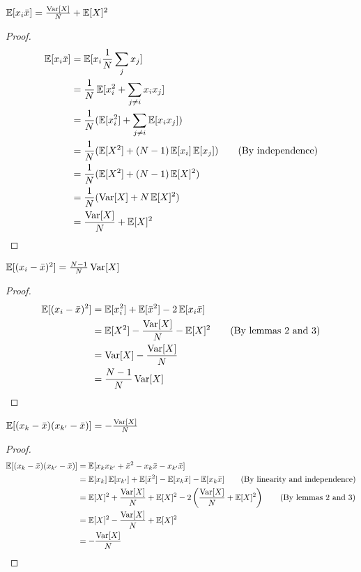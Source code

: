 \documentclass[11pt]{hw-template}
\begin{document}
    \begin{lemma}
      $\Ex[x_i\bar{x}] = \frac{\Var[X]}{N} + \Ex[X]^2$
    \end{lemma}
    \begin{proof}
      \begin{align*}
        \Ex[x_i\bar{x}] 
        &= \Ex[x_i\frac{1}{N}\sum_j x_j]\\
        &= \frac{1}{N}\Ex[x_i^2 + \sum_{j \neq i} x_ix_j]\\
        &= \frac{1}{N}(\Ex[x_i^2] + \sum_{j \neq i} \Ex[x_ix_j])\\
        &= \frac{1}{N}(\Ex[X^2] + (N-1) \Ex[x_i]\Ex[x_j]) \tag{By independence}\\
        &= \frac{1}{N}(\Ex[X^2] + (N-1) \Ex[X]^2)\\
        &= \frac{1}{N}(\Var[X] + N\Ex[X]^2)\\
        &= \frac{\Var[X]}{N} + \Ex[X]^2
      \end{align*}
    \end{proof}

    \begin{lemma}
      $\Ex[(x_i - \bar{x})^2] = \frac{N-1}{N}\Var[X]$
    \end{lemma}
    \begin{proof}
      \begin{align*}
        \Ex[(x_i - \bar{x})^2] 
        &= \Ex[x_i^2] + \Ex[\bar{x}^2] -2\Ex[x_i\bar{x}]\\
        &= \Ex[X^2] - \frac{\Var[X]}{N} - \Ex[X]^2 \tag{By lemmas 2 and 3}\\
        &= \Var[X] - \frac{\Var[X]}{N}\\
        &= \frac{N-1}{N}\Var[X]
      \end{align*}
    \end{proof}

    \begin{lemma}
      $\Ex[(x_k - \bar{x})(x_{k'} - \bar{x})] = -\frac{\Var[X]}{N}$
    \end{lemma}
    \begin{proof}
      \begin{align*}
        \Ex[(x_k - \bar{x})(x_{k'} - \bar{x})]
        &= \Ex[x_k x_{k'} + \bar{x}^2 - x_k\bar{x} - x_{k'}\bar{x}] \\
        &= \Ex[x_k] \Ex[x_{k'}] + \Ex[\bar{x}^2] - \Ex[x_k\bar{x}] - \Ex[x_k\bar{x}] \tag{By linearity and independence}\\
        &= \Ex[X]^2 + \frac{\Var[X]}{N} + \Ex[X]^2 - 2\paren{\frac{\Var[X]}{N} + \Ex[X]^2} \tag{By lemmas 2 and 3}\\
        &= \Ex[X]^2 - \frac{\Var[X]}{N} + \Ex[X]^2 \\
        &= - \frac{\Var[X]}{N}
      \end{align*}
    \end{proof}
    
\end{document}
